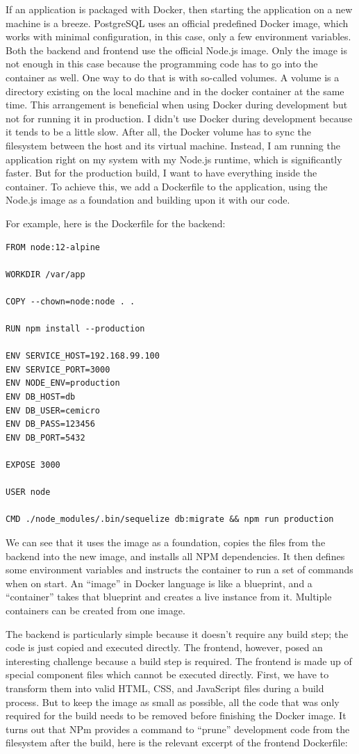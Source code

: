 If an application is packaged with Docker, then starting the application on a new machine is a breeze. PostgreSQL uses an official predefined Docker image, which works with minimal configuration, in this case, only a few environment variables. Both the backend and frontend use the official Node.js image. Only the image is not enough in this case because the programming code has to go into the container as well. One way to do that is with so-called volumes. A volume is a directory existing on the local machine and in the docker container at the same time. This arrangement is beneficial when using Docker during development but not for running it in production. I didn't use Docker during development because it tends to be a little slow. After all, the Docker volume has to sync the filesystem between the host and its virtual machine. Instead, I am running the application right on my system with my Node.js runtime, which is significantly faster. But for the production build, I want to have everything inside the container. To achieve this, we add a Dockerfile to the application, using the Node.js image as a foundation and building upon it with our code.

For example, here is the Dockerfile for the backend:

\begin{lstlisting}
FROM node:12-alpine

WORKDIR /var/app

COPY --chown=node:node . .

RUN npm install --production

ENV SERVICE_HOST=192.168.99.100
ENV SERVICE_PORT=3000
ENV NODE_ENV=production
ENV DB_HOST=db
ENV DB_USER=cemicro
ENV DB_PASS=123456
ENV DB_PORT=5432

EXPOSE 3000

USER node

CMD ./node_modules/.bin/sequelize db:migrate && npm run production
\end{lstlisting}

We can see that it uses the  image as a foundation, copies the files from the backend into the new image, and installs all NPM dependencies. It then defines some environment variables and instructs the container to run a set of commands when on start. An ``image'' in Docker language is like a blueprint, and a ``container'' takes that blueprint and creates a live instance from it. Multiple containers can be created from one image.

The backend is particularly simple because it doesn't require any build step; the code is just copied and executed directly. The frontend, however, posed an interesting challenge because a build step is required. The frontend is made up of special  component files which cannot be executed directly. First, we have to transform them into valid HTML, CSS, and JavaScript files during a build process. But to keep the image as small as possible, all the code that was only required for the build needs to be removed before finishing the Docker image. It turns out that NPm provides a command to ``prune'' development code from the filesystem after the build, here is the relevant excerpt of the frontend Dockerfile:

